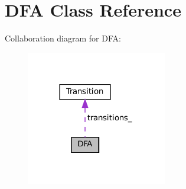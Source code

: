 \hypertarget{classDFA}{}\section{D\+FA Class Reference}
\label{classDFA}


Collaboration diagram for D\+FA\+:
\nopagebreak
\begin{figure}[H]
\begin{center}
\leavevmode
\includegraphics[width=173pt]{classDFA__coll__graph}
\end{center}
\end{figure}
